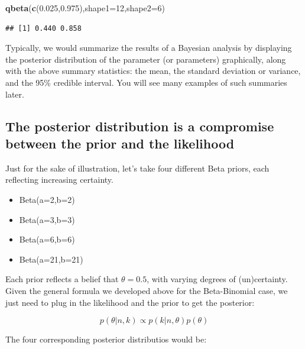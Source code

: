 \documentclass[12pt,]{krantz}
\newenvironment{Shaded}{\begin{snugshade}}{\end{snugshade}}
\newcommand{\DataTypeTok}[1]{\textcolor[rgb]{0.13,0.29,0.53}{#1}}
\newcommand{\DecValTok}[1]{\textcolor[rgb]{0.00,0.00,0.81}{#1}}
\newcommand{\FloatTok}[1]{\textcolor[rgb]{0.00,0.00,0.81}{#1}}
\newcommand{\KeywordTok}[1]{\textcolor[rgb]{0.13,0.29,0.53}{\textbf{#1}}}
\newcommand{\NormalTok}[1]{#1}
\providecommand{\tightlist}{%
  \setlength{\itemsep}{0pt}\setlength{\parskip}{0pt}}
\theoremstyle{definition}
\theoremstyle{definition}
\theoremstyle{definition}
\theoremstyle{remark}
\begin{document}
\begin{Shaded}
\begin{Highlighting}[]
\KeywordTok{qbeta}\NormalTok{(}\KeywordTok{c}\NormalTok{(}\FloatTok{0.025}\NormalTok{,}\FloatTok{0.975}\NormalTok{),}\DataTypeTok{shape1=}\DecValTok{12}\NormalTok{,}\DataTypeTok{shape2=}\DecValTok{6}\NormalTok{)}
\end{Highlighting}
\end{Shaded}

\begin{verbatim}
## [1] 0.440 0.858
\end{verbatim}

Typically, we would summarize the results of a Bayesian analysis by displaying the posterior distribution of the parameter (or parameters) graphically, along with the above summary statistics: the mean, the standard deviation or variance, and the 95\% credible interval. You will see many examples of such summaries later.

\hypertarget{the-posterior-distribution-is-a-compromise-between-the-prior-and-the-likelihood}{%
\subsection{The posterior distribution is a compromise between the prior and the likelihood}\label{the-posterior-distribution-is-a-compromise-between-the-prior-and-the-likelihood}}

Just for the sake of illustration, let's take four different Beta priors, each reflecting increasing certainty.

\begin{itemize}
\tightlist
\item
  Beta(a=2,b=2)
\item
  Beta(a=3,b=3)
\item
  Beta(a=6,b=6)
\item
  Beta(a=21,b=21)
\end{itemize}

Each prior reflects a belief that \(\theta=0.5\), with varying degrees of (un)certainty. Given the general formula we developed above for the Beta-Binomial case, we just need to plug in the likelihood and the prior to get the posterior:

\begin{equation}
p(\theta | n,k) \propto p(k |n,\theta) p(\theta)
\end{equation}

The four corresponding posterior distributios would be:
\end{document}
